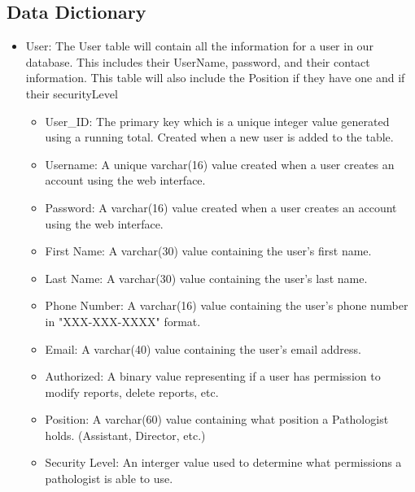\documentclass[onecolumn, draftclsnofoot, article, 10pt, compsoc]{IEEEtran}
\begin{document}
\subsection{Data Dictionary}
\begin{itemize}
\item User:\newline
The User table will contain all the information for a user in our database. This includes their UserName, password, and their contact information. This table will also include the Position if they have one and if their securityLevel 
\begin{itemize}
\item User\_ID: The primary key which is a unique integer value generated using a running total. Created when a new user is added to the table.
\item Username: A unique varchar(16) value created when a user creates an account using the web interface.
\item Password: A varchar(16) value created when a user creates an account using the web interface.
\item First Name: A varchar(30) value containing the user's first name.
\item Last Name: A varchar(30) value containing the user's last name.
\item Phone Number: A varchar(16) value containing the user's phone number in "XXX-XXX-XXXX" format.
\item Email: A varchar(40) value containing the user's email address.
\item Authorized: A binary value representing if a user has permission to modify reports, delete reports, etc.
\item Position: A varchar(60) value containing what position a Pathologist holds. (Assistant, Director, etc.)
\item Security Level: An interger value used to determine what permissions a pathologist is able to use.
\end{itemize}


\end{itemize}
\end{document}
